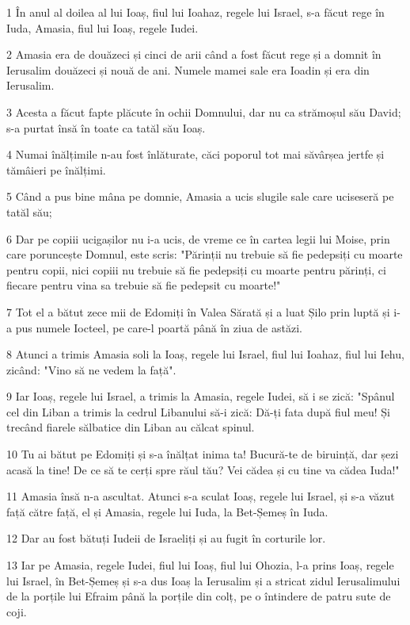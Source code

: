 \par 1 În anul al doilea al lui Ioaș, fiul lui Ioahaz, regele lui Israel, s-a făcut rege în Iuda, Amasia, fiul lui Ioaș, regele Iudei.
\par 2 Amasia era de douăzeci și cinci de arii când a fost făcut rege și a domnit în Ierusalim douăzeci și nouă de ani. Numele mamei sale era Ioadin și era din Ierusalim.
\par 3 Acesta a făcut fapte plăcute în ochii Domnului, dar nu ca strămoșul său David; s-a purtat însă în toate ca tatăl său Ioaș.
\par 4 Numai înălțimile n-au fost înlăturate, căci poporul tot mai săvârșea jertfe și tămâieri pe înălțimi.
\par 5 Când a pus bine mâna pe domnie, Amasia a ucis slugile sale care uciseseră pe tatăl său;
\par 6 Dar pe copiii ucigașilor nu i-a ucis, de vreme ce în cartea legii lui Moise, prin care poruncește Domnul, este scris: "Părinții nu trebuie să fie pedepsiți cu moarte pentru copii, nici copiii nu trebuie să fie pedepsiți cu moarte pentru părinți, ci fiecare pentru vina sa trebuie să fie pedepsit cu moarte!"
\par 7 Tot el a bătut zece mii de Edomiți în Valea Sărată și a luat Șilo prin luptă și i-a pus numele Iocteel, pe care-l poartă până în ziua de astăzi.
\par 8 Atunci a trimis Amasia soli la Ioaș, regele lui Israel, fiul lui Ioahaz, fiul lui Iehu, zicând: "Vino să ne vedem la față".
\par 9 Iar Ioaș, regele lui Israel, a trimis la Amasia, regele Iudei, să i se zică: "Spânul cel din Liban a trimis la cedrul Libanului să-i zică: Dă-ți fata după fiul meu! Și trecând fiarele sălbatice din Liban au călcat spinul.
\par 10 Tu ai bătut pe Edomiți și s-a înălțat inima ta! Bucură-te de biruință, dar șezi acasă la tine! De ce să te cerți spre răul tău? Vei cădea și cu tine va cădea Iuda!"
\par 11 Amasia însă n-a ascultat. Atunci s-a sculat Ioaș, regele lui Israel, și s-a văzut față către față, el și Amasia, regele lui Iuda, la Bet-Șemeș în Iuda.
\par 12 Dar au fost bătuți Iudeii de Israeliți și au fugit în corturile lor.
\par 13 Iar pe Amasia, regele Iudei, fiul lui Ioaș, fiul lui Ohozia, l-a prins Ioaș, regele lui Israel, în Bet-Șemeș și s-a dus Ioaș la Ierusalim și a stricat zidul Ierusalimului de la porțile lui Efraim până la porțile din colț, pe o întindere de patru sute de coji.
